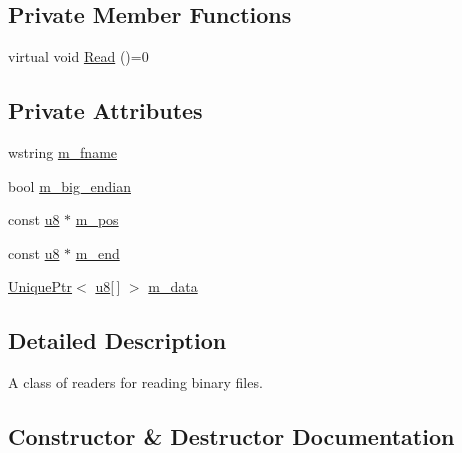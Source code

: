 \subsection*{Private Member Functions}
\begin{DoxyCompactItemize}
\item 
virtual void \hyperlink{classmage_1_1_binary_reader_a5c060c165f17a71f4218eb98c7091273}{Read} ()=0
\end{DoxyCompactItemize}
\subsection*{Private Attributes}
\begin{DoxyCompactItemize}
\item 
wstring \hyperlink{classmage_1_1_binary_reader_a9c97c02d53ce60a9952751ad4f55414f}{m\+\_\+fname}
\item 
bool \hyperlink{classmage_1_1_binary_reader_a8d23fde958e08efe248edb5d92861113}{m\+\_\+big\+\_\+endian}
\item 
const \hyperlink{namespacemage_a5a362e2d56fc439362a80516ecae7828}{u8} $\ast$ \hyperlink{classmage_1_1_binary_reader_a7973b89d2e97637ded2c446f0539ec6f}{m\+\_\+pos}
\item 
const \hyperlink{namespacemage_a5a362e2d56fc439362a80516ecae7828}{u8} $\ast$ \hyperlink{classmage_1_1_binary_reader_a6f676fd4c9ccddd6f1aadae455d01229}{m\+\_\+end}
\item 
\hyperlink{namespacemage_a3316d7143a973e37adf1110f2e80ca31}{Unique\+Ptr}$<$ \hyperlink{namespacemage_a5a362e2d56fc439362a80516ecae7828}{u8}\mbox{[}$\,$\mbox{]} $>$ \hyperlink{classmage_1_1_binary_reader_afd18df56e004f119e9e082458bf9efc6}{m\+\_\+data}
\end{DoxyCompactItemize}


\subsection{Detailed Description}
A class of readers for reading binary files. 

\subsection{Constructor \& Destructor Documentation}
\hypertarget{classmage_1_1_binary_reader_a42e6c31bc53f5214675f845756b5a404}{}\label{classmage_1_1_binary_reader_a42e6c31bc53f5214675f845756b5a404} 
